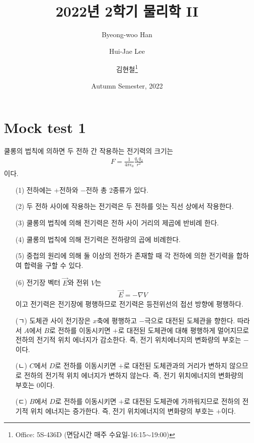 \documentclass[tightenlines,floatfix,nofootinbib,superscriptaddress,fleqn]{revtex4}
\begin{document}
\title{\Large 2022년 2학기 물리학 II}
\author{Byeong-woo Han}
  \author{Hui-Jae Lee}
\author{김현철\footnote{Office: 5S-436D (면담시간 매주
    수요일-16:15$\sim$19:00)}} 
\date{Autumn Semester, 2022}

\maketitle

\section*{\large Mock test 1 }
 쿨롱의 법칙에 의하면 두 전하 간 작용하는 전기력의 크기는
\begin{align}
  F = \frac{1}{4\pi \epsilon_0}\frac{q_1q_2}{r^2}
\end{align}
이다.
\\

\begin{itemize}
  \item[(1)] 전하에는 $+$전하와 $-$전하 총 2종류가 있다.
  \item[(2)] 두 전하 사이에 작용하는 전기력은 두 전하를 잇는 직선 상에서 작용한다.
  \item[(3)] 쿨롱의 법칙에 의해 전기력은 전하 사이 거리의 제곱에 반비례 한다.
  \item[(4)] 쿨롱의 법칙에 의해 전기력은 전하량의 곱에 비례한다.
  \item[(5)] 중첩의 원리에 의해 둘 이상의 전하가 존재할 때 각 전하에 의한 전기력을 합하여
  합력을 구할 수 있다.
  \item[(6)] 전기장 벡터 $\vec{E}$와 전위 $V$는
  \begin{align}
    \vec{E} = -\nabla V
  \end{align}
  이고 전기력은 전기장에 평행하므로 전기력은 등전위선의 접선 방향에 평행하다.
\end{itemize}

\begin{itemize}
  \item[(ㄱ)] 도체관 사이 전기장은 $x$축에 평행하고 $-$극으로 대전된 도체관을 향한다.
  따라서 $A$에서 $B$로 전하를 이동시키면 $+$로 대전된 도체관에 대해 평행하게 멀어지므로 
  전하의 전기적 위치 에너지가 감소한다. 즉, 전기 위치에너지의 변화량의 부호는 $-$이다.
  \item[(ㄴ)] $C$에서 $D$로 전하를 이동시키면 $+$로 대전된 도체관과의 거리가 변하지 않으므로
  전하의 전기적 위치 에너지가 변하지 않는다. 즉, 전기 위치에너지의 변화량의 부호는 $0$이다.
  \item[(ㄷ)]  $B$에서 $D$로 전하를 이동시키면 $+$로 대전된 도체관에 가까워지므로
  전하의 전기적 위치 에너지는 증가한다. 즉, 전기 위치에너지의 변화량의 부호는 $+$이다.
\end{itemize}
\end{document}
